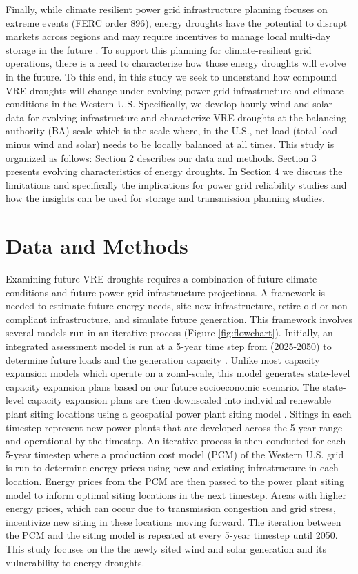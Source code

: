 \documentclass{agujournal2019}
\begin{document}
Finally, while climate resilient power grid infrastructure planning focuses on extreme events (FERC order 896), energy droughts have the potential to disrupt markets across regions \cite{Hill_2021} and may require incentives to manage local multi-day storage in the future \cite{Bracken2024}. To support this planning for climate-resilient grid operations, there is a need to characterize how those energy droughts will evolve in the future. To this end, in this study we seek to understand how compound VRE droughts will change under evolving power grid infrastructure and climate conditions in the Western U.S. Specifically, we develop hourly wind and solar data for evolving infrastructure and characterize VRE droughts at the balancing authority (BA) scale which is the scale where, in the U.S., net load (total load minus wind and solar) needs to be locally balanced at all times. This study is organized as follows: Section 2 describes our data and methods. Section 3 presents evolving characteristics of energy droughts. In Section 4 we discuss the limitations and specifically the implications for power grid reliability studies and how the insights can be used for storage and transmission planning studies. 

\section{Data and Methods}

Examining future VRE droughts requires a combination of future climate conditions and future power grid infrastructure projections. A framework is needed to estimate future energy needs, site new infrastructure, retire old or non-compliant infrastructure, and simulate future generation. This framework involves several models run in an iterative process (Figure \ref{fig:flowchart}). Initially, an integrated assessment model is run at a 5-year time step from (2025-2050) to determine future loads and the generation capacity \cite{Ou2024}. Unlike most capacity expansion models which operate on a zonal-scale, this model generates state-level capacity expansion plans based on our future socioeconomic scenario. The state-level capacity expansion plans are then downscaled into individual renewable plant siting locations using a geospatial power plant siting model \cite{Vernon_2021}. Sitings in each timestep represent new power plants that are developed across the 5-year range and operational by the timestep. An iterative process is then conducted for each 5-year timestep where a production cost model (PCM) of the Western U.S. grid is run to determine energy prices using new and existing infrastructure in each location. Energy prices from the PCM are then passed to the power plant siting model to inform optimal siting locations in the next timestep. Areas with higher energy prices, which can occur due to transmission congestion and grid stress, incentivize new siting in these locations moving forward. The iteration between the PCM and the siting model is repeated at every 5-year timestep until 2050. This study focuses on the the newly sited wind and solar generation and its vulnerability to energy droughts. %
\end{document}
